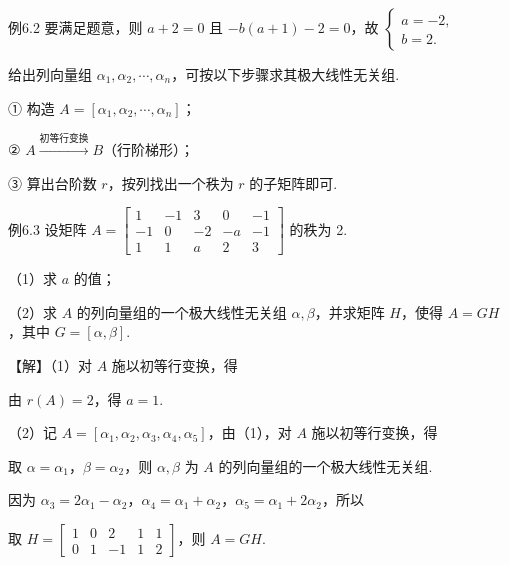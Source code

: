 \begin{fcard}{例6.2}
要满足题意，则 $a+2=0$ 且 $-b(a+1)-2=0$，故 $\begin{cases}a=-2,\\b=2.\end{cases}$
\end{fcard}


给出列向量组 $\alpha_1,\alpha_2,\cdots,\alpha_n$，可按以下步骤求其极大线性无关组.

① 构造 $A=[\alpha_1,\alpha_2,\cdots,\alpha_n]$；

② $A\xrightarrow{\text{初等行变换}}B$（行阶梯形）；

③ 算出台阶数 $r$，按列找出一个秩为 $r$ 的子矩阵即可.

\begin{fcard}{例6.3}
设矩阵 $A=\begin{bmatrix}1&-1&3&0&-1\\-1&0&-2&-a&-1\\1&1&a&2&3\end{bmatrix}$ 的秩为 2.

（1）求 $a$ 的值；

（2）求 $A$ 的列向量组的一个极大线性无关组 $\alpha,\beta$，并求矩阵 $H$，使得 $A=GH$，其中 $G=[\alpha,\beta]$.


【解】（1）对 $A$ 施以初等行变换，得


由 $r(A)=2$，得 $a=1$.

（2）记 $A=[\alpha_1,\alpha_2,\alpha_3,\alpha_4,\alpha_5]$，由（1），对 $A$ 施以初等行变换，得


取 $\alpha=\alpha_1$，$\beta=\alpha_2$，则 $\alpha,\beta$ 为 $A$ 的列向量组的一个极大线性无关组.

因为 $\alpha_3=2\alpha_1-\alpha_2$，$\alpha_4=\alpha_1+\alpha_2$，$\alpha_5=\alpha_1+2\alpha_2$，所以


取 $H=\begin{bmatrix}1&0&2&1&1\\0&1&-1&1&2\end{bmatrix}$，则 $A=GH$.
\end{fcard}
